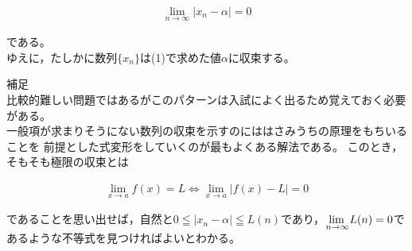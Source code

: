\documentclass[autodetect-engine,ja=standard, 10.5pt, a4paper, titlepage]{bxjsarticle}
\begin{document}
\begin{enumerate}[1.]
\begin{enumerate}[(1)]
\begin{fleqn}[20pt]
\begin{align*}
          \lim_{n\to\infty}|x_n - \alpha| = 0
        \end{align*}
      \end{fleqn}
    である。\\
    ゆえに，たしかに数列$\{x_n\}$は(1)で求めた値$\alpha$に収束する。
    \end{enumerate}
    \baselineskip
    \noindent 補足\\
    比較的難しい問題ではあるがこのパターンは入試によく出るため覚えておく必要がある。 \\
    一般項が求まりそうにない数列の収束を示すのにははさみうちの原理をもちいることを
    前提とした式変形をしていくのが最もよくある解法である。
    このとき，そもそも極限の収束とは
      \begin{fleqn}[20pt]
        \begin{align*}
          \lim_{x\to a}f(x) = L \Leftrightarrow \lim_{x\to a}|f(x) - L| = 0
        \end{align*}
      \end{fleqn}
    であることを思い出せば，自然と$0\leqq |x_n - \alpha| \leqq L(n)$であり，
    $\lim \!\!\!\!\!\!\!\!\!\!\! \raisebox{-4pt}{$_{n\to\infty}$}L(n) = 0$であるような不等式を見つければよいとわかる。


\end{enumerate}
\end{document}
